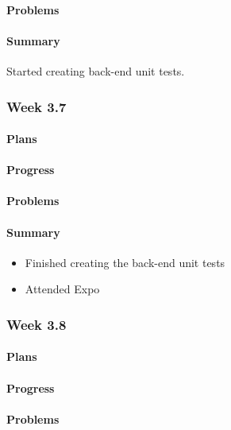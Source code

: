 \documentclass[onecolumn, draftclsnofoot,10pt, compsoc]{article}
\begin{document}
		    \paragraph{Problems} \hfill \break

		    \paragraph{Summary} \hfill \break
		        Started creating back-end unit tests.

		\subsubsection{Week 3.7}
		    \paragraph{Plans} \hfill \break

		    \paragraph{Progress} \hfill \break

		    \paragraph{Problems} \hfill \break

		    \paragraph{Summary} \hfill \break
		    	\begin{itemize}
                    \item Finished creating the back-end unit tests
                    \item Attended Expo
                \end{itemize}

		\subsubsection{Week 3.8}
		    \paragraph{Plans} \hfill \break
		    \paragraph{Progress} \hfill \break
		    \paragraph{Problems} \hfill \break
\end{document}
